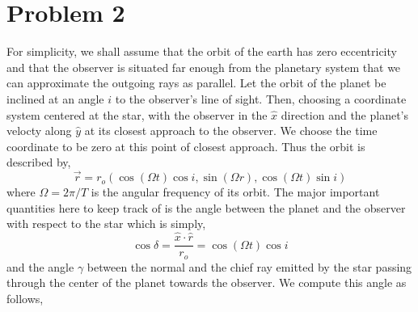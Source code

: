 \documentclass[12pt]{article}
\begin{document}
\section*{Problem 2}

For simplicity, we shall assume that the orbit of the earth has zero eccentricity and that the observer is situated far enough from the planetary system that we can approximate the outgoing rays as parallel. Let the orbit of the planet be inclined at an angle $i$ to the observer's line of sight. Then, choosing a coordinate system centered at the star, with the observer in the $\hat{x}$ direction and the planet's velocty along $\hat{y}$ at its closest approach to the observer. We choose the time coordinate to be zero at this point of closest approach. Thus the orbit is described by,
\[ \vec{r} = r_o (\cos{(\Omega t)} \cos{i}, \sin{(\Omega r)}, \cos{(\Omega t)} \sin{i}) \]
where $\Omega = 2 \pi / T$ is the angular frequency of its orbit. The major important quantities here to keep track of is the angle between the planet and the observer with respect to the star which is simply,
\[ \cos{\delta} = \frac{\hat{x} \cdot \hat{r}}{r_o} = \cos{(\Omega t)} \cos{i} \]
and the angle $\gamma$ between the normal and the chief ray emitted by the star passing through the center of the planet towards the observer. We compute this angle as follows,  
\begin{center}
\end{center}
\end{document}
